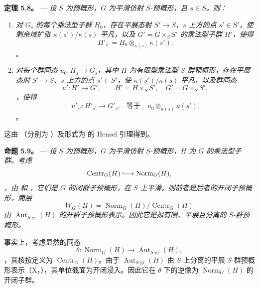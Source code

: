 \medskip\noindent{}\textbf{定理 5.8。} --- \textit{设 \(S\) 为预概形，\(G\) 为平滑仿射 \(S\)-预概形，且 \(s\in S\)。则：}

\begin{enumerate}\item[(a)]\textit{对 \(G_s\) 的每个乘法型子群 \(H_0\)，存在平展态射 \(S'\to S\)、\(s\) 上方的点 \(s'\in S'\)，使剩余域扩张 \(\kappa(s')/\kappa(s)\) 平凡，以及 \(G'=G\times_S S'\) 的乘法型子群 \(H'\)，使得}  \[
  H'_{s'}=H_0\otimes_{\kappa(s)}\kappa(s').
\]。

\item[(b)]\textit{对每个群同态 \(u_0:H_s\to G_s\)，其中 \(H\) 为有限型乘法型 \(S\)-群预概形，存在平展态射 \(S'\to S\)、\(s\) 上方的点 \(s'\in S'\)，使 \(\kappa(s')/\kappa(s)\) 平凡，以及群同态 \[
  u':H'\longrightarrow G',
  \qquad
  H'=H\times_S S',
  \quad
  G'=G\times_S S',
\]，使得}  \[
  u'_{s'}:H'_{s'}\longrightarrow G'_{s'}
  \quad\text{等于}\quad
  u_0\otimes_{\kappa(s)}\kappa(s').
\]。\end{enumerate}

这由 （分别为 ）及形式为  的 Hensel 引理得到。

\medskip\noindent{}\textbf{命题 5.9。} --- \textit{设 \(S\) 为预概形，\(G\) 为平滑仿射 \(S\)-预概形，\(H\) 为 \(G\) 的乘法型子群。考虑} \[
  \operatorname{Centr}_G(H)\lhook\joinrel\longrightarrow
  \operatorname{Norm}_G(H),
\]\textit{，由  和 ，它们是 \(G\) 的闭群子预概形，在 \(S\) 上平滑。则前者是后者的开闭子预概形，商层}  \[
  W_G(H)=
  \operatorname{Norm}_G(H)\big/\operatorname{Centr}_G(H)
\]\textit{由 \(\operatorname{Aut}_{S\text{-}\mathrm{gr}}(H)\) 的开群子预概形表示。因此它是拟有限、平展且分离的 \(S\)-群预概形。}

事实上，考虑显然的同态  \[
  \theta:\operatorname{Norm}_G(H)\longrightarrow
  \operatorname{Aut}_{S\text{-}\mathrm{gr}}(H),
\]，其核按定义为 \(\operatorname{Centr}_G(H)\)。由于 \(\operatorname{Aut}_{S\text{-}\mathrm{gr}}(H)\) 由 \(S\) 上分离的平展 \(S\)-群预概形表示（X，），其单位截面为开闭浸入。因此它在 \(\theta\) 下的逆像为 \(\operatorname{Norm}_G(H)\) 的开闭子群。

